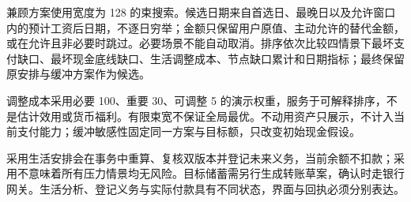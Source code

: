 兼顾方案使用宽度为 128 的束搜索。候选日期来自首选日、最晚日以及允许窗口内的预计工资后日期，不逐日穷举；金额只保留用户原值、主动允许的替代金额，或在允许且非必要时跳过。必要场景不能自动取消。排序依次比较四情景下最坏支付缺口、最坏现金底线缺口、生活调整成本、节点缺口累计和日期指标；最终保留原安排与缓冲方案作为候选。

调整成本采用必要 100、重要 30、可调整 5 的演示权重，服务于可解释排序，不是估计效用或货币福利。有限束宽不保证全局最优。不动用资产只展示，不计入当前支付能力；缓冲敏感性固定同一方案与目标额，只改变初始现金假设。

采用生活安排会在事务中重算、复核双版本并登记未来义务，当前余额不扣款；采用不意味着所有压力情景均无风险。目标储蓄需另行生成转账草案，确认时走银行网关。生活分析、登记义务与实际付款具有不同状态，界面与回执必须分别表达。
